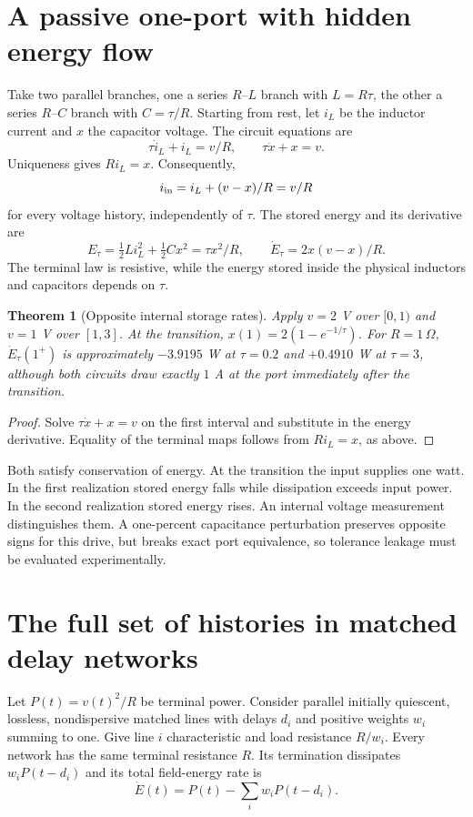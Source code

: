 \documentclass[11pt]{amsart}
\newtheorem{theorem}{Theorem}[section]
\theoremstyle{remark}\newtheorem{remark}[theorem]{Remark}
\begin{document}
\section{A passive one-port with hidden energy flow}
Take two parallel branches, one a series $R$--$L$ branch with $L=R\tau$, the other a series $R$--$C$ branch with $C=\tau/R$. Starting from rest, let $i_L$ be the inductor current and $x$ the capacitor voltage. The circuit equations are
\[
\tau\dot i_L+i_L=v/R,\qquad \tau\dot x+x=v.
\]
Uniqueness gives $Ri_L=x$. Consequently,
\[
i_{\rm in}=i_L+(v-x)/R=v/R
\]
for every voltage history, independently of $\tau$. The stored energy and its derivative are
\[
E_\tau=\tfrac12Li_L^2+\tfrac12Cx^2=\tau x^2/R,\qquad
\dot E_\tau=2x(v-x)/R.
\]
The terminal law is resistive, while the energy stored inside the physical inductors and capacitors depends on $\tau$.

\begin{theorem}[Opposite internal storage rates]
Apply $v=2$ V over $[0,1)$ and $v=1$ V over $[1,3]$. At the transition, $x(1)=2(1-e^{-1/\tau})$. For $R=1\,\Omega$, $\dot E_\tau(1^+)$ is approximately $-3.9195$ W at $\tau=0.2$ and $+0.4910$ W at $\tau=3$, although both circuits draw exactly $1$ A at the port immediately after the transition.
\end{theorem}
\begin{proof}
Solve $\tau\dot x+x=v$ on the first interval and substitute in the energy derivative. Equality of the terminal maps follows from $Ri_L=x$, as above.
\end{proof}
Both satisfy conservation of energy. At the transition the input supplies one watt. In the first realization stored energy falls while dissipation exceeds input power. In the second realization stored energy rises. An internal voltage measurement distinguishes them. A one-percent capacitance perturbation preserves opposite signs for this drive, but breaks exact port equivalence, so tolerance leakage must be evaluated experimentally.

\section{The full set of histories in matched delay networks}
Let $P(t)=v(t)^2/R$ be terminal power. Consider parallel initially quiescent, lossless, nondispersive matched lines with delays $d_i$ and positive weights $w_i$ summing to one. Give line $i$ characteristic and load resistance $R/w_i$. Every network has the same terminal resistance $R$. Its termination dissipates $w_iP(t-d_i)$ and its total field-energy rate is
\[
\dot E(t)=P(t)-\sum_iw_iP(t-d_i).
\]
\end{document}
